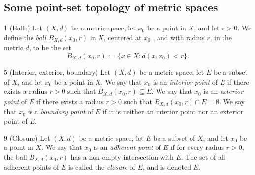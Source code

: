 \subsection{Some point-set topology of metric spaces}
\begin{definition}{1}
    \label{metric-ball}
    (Balls) Let $(X, d)$ be a metric space, let $x_0$ be a point in $X$, and let
    $r > 0$. We define the \emph{ball} $B_{X, d}(x_0, r)$ in $X$, centered at $x_0$
    , and with radius $r$, in the metric $d$, to be the set
    \begin{equation*}
        B_{X, d}(x_0, r) := \{x \in X: d(x, x_0) < r\}.
    \end{equation*}
\end{definition}

\begin{definition}{5}
    \label{interior-exterior-boundary}
    (Interior, exterior, boundary) Let $(X, d)$ be a metric space, let $E$ be a subset
    of $X$, and let $x_0$ be a point in $X$. We say that $x_0$ is an \emph{interior
    point} of $E$ if there exists a radius $r > 0$ such that $B_{X, d}(x_0, r) \subseteq E$.
    We say that $x_0$ is an \emph{exterior point} of $E$ if there exists a radius $r > 0$
    such that $B_{X, d}(x_0, r) \cap E = \emptyset$. We say that $x_0$ is a \emph{boundary
    point} of $E$ if it is neither an interior point nor an exterior point of $E$.
\end{definition}

\begin{definition}{9}
    \label{closure}
    (Closure) Let $(X, d)$ be a metric space, let $E$ be a subset of $X$, and let $x_0$
    be a point in $X$. We say that $x_0$ is an \emph{adherent point} of $E$ if for every
    radius $r > 0$, the ball $B_{X, d}(x_0, r)$ has a non-empty intersection with $E$.
    The set of all adherent points of $E$ is called the \emph{closure} of $E$, and is
    denoted $\overline{E}$.
\end{definition}


